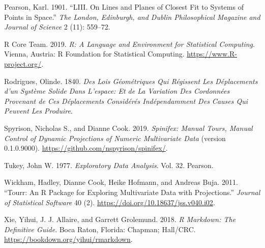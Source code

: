 \documentclass[11,]{article}
\begin{document}
\leavevmode\hypertarget{ref-pearson_liii._1901}{}%
Pearson, Karl. 1901. ``LIII. On Lines and Planes of Closest Fit to Systems of Points in Space.'' \emph{The London, Edinburgh, and Dublin Philosophical Magazine and Journal of Science} 2 (11): 559--72.

\leavevmode\hypertarget{ref-r_core_team_r:_2019}{}%
R Core Team. 2019. \emph{R: A Language and Environment for Statistical Computing}. Vienna, Austria: R Foundation for Statistical Computing. \url{https://www.R-project.org/}.

\leavevmode\hypertarget{ref-rodrigues_lois_1840}{}%
Rodrigues, Olinde. 1840. \emph{Des Lois Géométriques Qui Régissent Les Déplacements d'un Système Solide Dans L'espace: Et de La Variation Des Cordonnées Provenant de Ces Déplacements Considérés Indépendamment Des Causes Qui Peuvent Les Produire}.

\leavevmode\hypertarget{ref-spyrison_spinifex_2019}{}%
Spyrison, Nicholas S., and Dianne Cook. 2019. \emph{Spinifex: Manual Tours, Manual Control of Dynamic Projections of Numeric Multivariate Data} (version 0.1.0.9000). \url{https://github.com/nspyrison/spinifex/}.

\leavevmode\hypertarget{ref-tukey_exploratory_1977}{}%
Tukey, John W. 1977. \emph{Exploratory Data Analysis}. Vol. 32. Pearson.

\leavevmode\hypertarget{ref-wickham_tourr:_2011}{}%
Wickham, Hadley, Dianne Cook, Heike Hofmann, and Andreas Buja. 2011. ``Tourr: An R Package for Exploring Multivariate Data with Projections.'' \emph{Journal of Statistical Software} 40 (2). \url{https://doi.org/10.18637/jss.v040.i02}.

\leavevmode\hypertarget{ref-xie_r_2018}{}%
Xie, Yihui, J. J. Allaire, and Garrett Grolemund. 2018. \emph{R Markdown: The Definitive Guide}. Boca Raton, Florida: Chapman; Hall/CRC. \url{https://bookdown.org/yihui/rmarkdown}.
\end{document}
